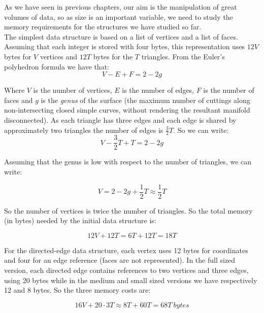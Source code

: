 As we have seen in previous chapters, our aim is the manipulation of great volumes of data, so as size is an important variable, we need to study the memory requirements for the structures we have studied so far.\\

The simplest data structure is based on a list of vertices and a list of faces. Assuming that each integer is stored with four bytes, this representation uses $12V$ bytes for $V$ vertices and $12T$ bytes for the $T$ triangles. From the Euler's polyhedron formula we have that:
\begin{equation}
 V - E + F = 2 - 2g
\end{equation}

Where $V$ is the number of vertices, $E$ is the number of edges, $F$ is the number of faces and $g$ is the \textit{genus} of the surface (the maximum number of cuttings along non-intersecting closed simple curves, without rendering the resultant manifold disconnected). As each triangle has three edges and each edge is shared by approximately two triangles the number of edges is $\frac{3}{2}T$. So we can write:
\begin{equation}
 V - \frac{3}{2}T + T = 2 - 2g
\end{equation}

Assuming that the genus is low with respect to the number of triangles, we can write:

\begin{equation}
 V = 2 - 2g + \frac{1}{2}T \approx \frac{1}{2}T
\end{equation}

So the number of vertices is twice the number of triangles. So the total memory (in bytes) needed by the initial data structure is:

\begin{equation}
 12V + 12T = 6T + 12T = 18T
\end{equation}

For the directed-edge data structure, each vertex uses 12 bytes for coordinates and four for an edge reference (faces are not represented). In the full sized version, each directed edge contains references to two vertices and three edges, using 20 bytes while in the medium and small sized versions we have respectively 12 and 8 bytes. So the three memory costs are:

\begin{equation}
 16V + 20\cdot 3 T \approx 8 T + 60 T = 68 T \: bytes
\end{equation}

